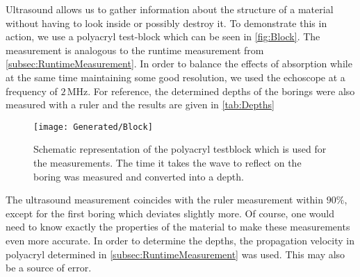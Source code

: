 \documentclass[a4paper,10pt,twocolumn]{article}
\begin{document}
    Ultrasound allows us to gather information about the structure of a material without having to look inside or possibly destroy it.
    To demonstrate this in action, we use a polyacryl test-block which can be seen in \autoref{fig:Block}.
    The measurement is analogous to the runtime measurement from \autoref{subsec:RuntimeMeasurement}.
    In order to balance the effects of absorption while at the same time maintaining some good resolution, we used the echoscope at a frequency of $2\,$MHz.
    For reference, the determined depths of the borings were also measured with a ruler and the results are given in \autoref{tab:Depths}
    \begin{figure}
        \begin{center}
            \texttt{[image: Generated/Block]}
            \caption[]{Schematic representation of the polyacryl testblock which is used for the measurements.
            The time it takes the wave to reflect on the boring was measured and converted into a depth.}
            \label{fig:Block}
        \end{center}
    \end{figure}
    
    The ultrasound measurement coincides with the ruler measurement within $90 \% $, except for the first boring which deviates slightly more.
    Of course, one would need to know exactly the properties of the material to make these measurements even more accurate.
    In order to determine the depths, the propagation velocity in polyacryl determined in \autoref{subsec:RuntimeMeasurement} was used.
    This may also be a source of error.
    
    
    
\end{document}
